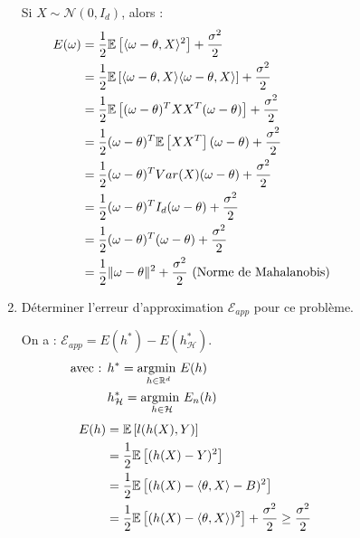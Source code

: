 \documentclass[12pt,a4paper]{article}
\begin{document}
\begin{enumerate}
    \color{blue}
    Si $X \sim \mathcal{N}(0, I_d)$, alors :
    \begin{align*}
        E(\omega) &= \frac{1}{2} \mathbb{E} \left[\langle \omega - \theta, X \rangle ^2 \right] + \frac{\sigma^2 }{2} \hspace{14.5cm} \\
        &= \frac{1}{2} \mathbb{E} \left[\langle \omega - \theta, X \rangle \langle \omega - \theta, X \rangle \right] + \frac{\sigma^2 }{2} \\
        &= \frac{1}{2} \mathbb{E} \left[(\omega - \theta)^T X X^T (\omega - \theta) \right] + \frac{\sigma^2 }{2} \\
        &= \frac{1}{2} (\omega - \theta)^T \mathbb{E} \left[X X^T \right] (\omega - \theta) + \frac{\sigma^2 }{2} \\
        &= \frac{1}{2} (\omega - \theta)^T Var(X) (\omega - \theta) + \frac{\sigma^2 }{2} \\
        &= \frac{1}{2} (\omega - \theta)^T I_d (\omega - \theta) + \frac{\sigma^2 }{2} \\
        &= \frac{1}{2} (\omega - \theta)^T (\omega - \theta) + \frac{\sigma^2 }{2} \\
        &= \frac{1}{2} \|\omega - \theta\|^2 + \frac{\sigma^2 }{2} \text{ (Norme de Mahalanobis)}\\
    \end{align*}

    \color{black}
    \item Déterminer l’erreur d’approximation $\mathcal{E}_{app}$ pour ce problème.
    
    \color{blue}
    On a : $\mathcal{E}_{app} = E(h^*) - E(h^*_\mathcal{H})$.
    \begin{align*}
        \text{avec : } &h^* = \underset{h \in \mathbb{R}^d}{\text{argmin }} E(h) \hspace{14.5cm}\\
        &h^*_\mathcal{H} = \underset{h \in \mathcal{H}}{\text{argmin }} E_n(h)
    \end{align*}
    \begin{align*}
        E(h) &= \mathbb{E} \left[l(h(X), Y)\right] \hspace{14.5cm}\\
        &= \frac{1}{2} \mathbb{E} \left[(h(X) - Y)^2\right] \\
        &= \frac{1}{2} \mathbb{E} \left[(h(X) - \langle \theta, X \rangle - B)^2\right] \\
        &= \frac{1}{2} \mathbb{E} \left[(h(X) - \langle \theta, X \rangle)^2\right] + \frac{\sigma^2 }{2} \geq \frac{\sigma^2 }{2}
    \end{align*}


\end{enumerate}
\end{document}
